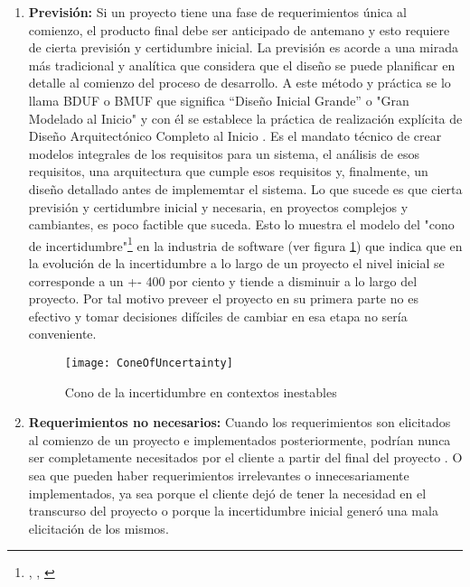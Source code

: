 \begin{enumerate}

\item \textbf{Previsión:} \newline
Si un proyecto tiene una fase de requerimientos única al comienzo, el producto final debe ser anticipado de antemano \cite{Scrum-Institute-2015} y esto requiere de cierta previsión y certidumbre inicial. La previsión es acorde a una mirada más tradicional y analítica que considera que el diseño se puede planificar en detalle al comienzo del proceso de desarrollo. A este método y práctica se lo llama BDUF o BMUF que significa “Diseño Inicial Grande” o "Gran Modelado al Inicio" y con él se establece la práctica de realización explícita de Diseño Arquitectónico Completo al Inicio \cite{Wiley-Sons-2002}. Es el mandato técnico de crear modelos integrales de los requisitos para un sistema, el análisis de esos requisitos, una arquitectura que cumple esos requisitos y, finalmente, un diseño detallado antes de implememtar el sistema. Lo que sucede es que cierta previsión y certidumbre inicial y necesaria, en proyectos complejos y cambiantes, es poco factible que suceda. Esto lo muestra el modelo del "cono de incertidumbre"\footnote{\cite{McConnell-2006}, \cite{Boehm-1981}, \cite{Martin-Alaimo-2014}} en la industria de software (ver figura \ref{fig:ConeOfUncertainty}) que indica que en la evolución de la incertidumbre a lo largo de un proyecto el nivel inicial se corresponde a un +- 400 por ciento y tiende a disminuir a lo largo del proyecto. Por tal motivo preveer el proyecto en su primera parte no es efectivo y tomar decisiones difíciles de cambiar en esa etapa no sería conveniente.

\begin{figure}[h]
  \centering
  \texttt{[image: ConeOfUncertainty]}
  \caption{Cono de la incertidumbre en contextos inestables}
  \centering
  \label{fig:ConeOfUncertainty} %
\end{figure}

\item \textbf{Requerimientos no necesarios:} \newline
Cuando los requerimientos son elicitados al comienzo de un proyecto e implementados posteriormente, podrían nunca ser completamente necesitados por el cliente a partir del final del proyecto \cite{Scrum-Institute-2015}. O sea que pueden haber requerimientos irrelevantes o innecesariamente implementados, ya sea porque el cliente dejó de tener la necesidad en el transcurso del proyecto o porque la incertidumbre inicial generó una mala elicitación de los mismos.


\end{enumerate}
